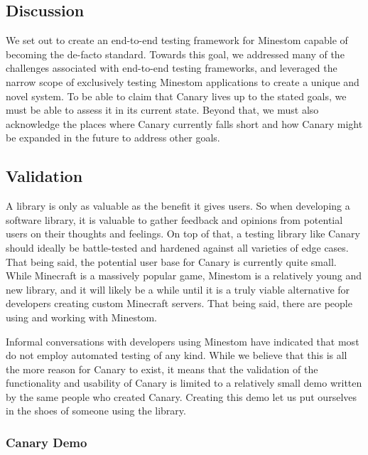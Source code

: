 \documentclass[12pt]{article}
\begin{document}
\begin{onehalfspacing}

\section{Discussion}

We set out to create an end-to-end testing framework for Minestom
capable of becoming the de-facto standard. Towards this goal, we
addressed many of the challenges associated with end-to-end testing
frameworks, and leveraged the narrow scope of exclusively testing
Minestom applications to create a unique and novel system. To be able to
claim that Canary lives up to the stated goals, we must be able to
assess it in its current state. Beyond that, we must also acknowledge
the places where Canary currently falls short and how Canary might be
expanded in the future to address other goals.

\subsection{Validation}

A library is only as valuable as the benefit it gives users. So when
developing a software library, it is valuable to gather feedback and
opinions from potential users on their thoughts and feelings. On top of
that, a testing library like Canary should ideally be battle-tested and
hardened against all varieties of edge cases. That being said, the
potential user base for Canary is currently quite small. While Minecraft
is a massively popular game, Minestom is a relatively young and new
library, and it will likely be a while until it is a truly viable
alternative for developers creating custom Minecraft servers. That being
said, there are people using and working with Minestom.

Informal conversations with developers using Minestom have indicated
that most do not employ automated testing of any kind. While we believe
that this is all the more reason for Canary to exist, it means that the
validation of the functionality and usability of Canary is limited to a
relatively small demo written by the same people who created Canary.
Creating this demo let us put ourselves in the shoes of someone using
the library.

\subsubsection{Canary Demo}


\end{onehalfspacing}
\end{document}
